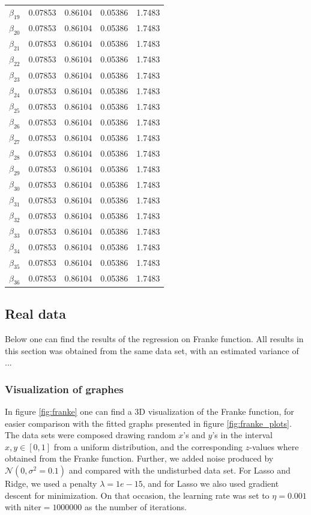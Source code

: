 \begin{table} [H]
\begin{tabularx}{\textwidth}{l|XXXX}
		$\beta_{19}$ & 0.07853 & 0.86104 & 0.05386 & 1.7483\\
		$\beta_{20}$ & 0.07853 & 0.86104 & 0.05386 & 1.7483\\
		$\beta_{21}$ & 0.07853 & 0.86104 & 0.05386 & 1.7483\\
		$\beta_{22}$ & 0.07853 & 0.86104 & 0.05386 & 1.7483\\
		$\beta_{23}$ & 0.07853 & 0.86104 & 0.05386 & 1.7483\\
		$\beta_{24}$ & 0.07853 & 0.86104 & 0.05386 & 1.7483\\
		$\beta_{25}$ & 0.07853 & 0.86104 & 0.05386 & 1.7483\\
		$\beta_{26}$ & 0.07853 & 0.86104 & 0.05386 & 1.7483\\
		$\beta_{27}$ & 0.07853 & 0.86104 & 0.05386 & 1.7483\\
		$\beta_{28}$ & 0.07853 & 0.86104 & 0.05386 & 1.7483\\
		$\beta_{29}$ & 0.07853 & 0.86104 & 0.05386 & 1.7483\\
		$\beta_{30}$ & 0.07853 & 0.86104 & 0.05386 & 1.7483\\
		$\beta_{31}$ & 0.07853 & 0.86104 & 0.05386 & 1.7483\\
		$\beta_{32}$ & 0.07853 & 0.86104 & 0.05386 & 1.7483\\
		$\beta_{33}$ & 0.07853 & 0.86104 & 0.05386 & 1.7483\\
		$\beta_{34}$ & 0.07853 & 0.86104 & 0.05386 & 1.7483\\
		$\beta_{35}$ & 0.07853 & 0.86104 & 0.05386 & 1.7483\\
		$\beta_{36}$ & 0.07853 & 0.86104 & 0.05386 & 1.7483\\ \hline
	\end{tabularx}
\end{table}

\subsection{Real data}
Below one can find the results of the regression on Franke function. All results in this section was obtained from the same data set, with an estimated variance of ...

\subsubsection{Visualization of graphes}
In figure \eqref{fig:franke} one can find a 3D visualization of the Franke function, for easier comparison with the fitted graphs presented in figure \eqref{fig:franke_plots}. The data sets were composed drawing random $x$'s and $y$'s in the interval $x,y\in[0,1]$ from a uniform distribution, and the corresponding $z$-values where obtained from the Franke function. Further, we added noise produced by $\mathcal{N}(0, \sigma^2=0.1)$ and compared with the undisturbed data set. For Lasso and Ridge, we used a penalty $\lambda=1e-15$, and for Lasso we also used gradient descent for minimization. On that occasion, the learning rate was set to $\eta=0.001$ with niter$=1000000$ as the number of iterations. 


